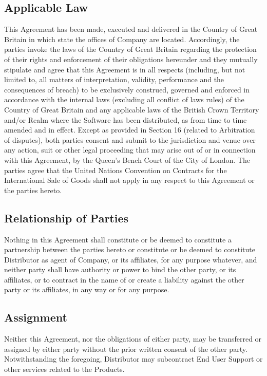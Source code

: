 \documentclass[letterpaper,10pt,english]{sphinxmanual}
\begin{document}
\subsection{Applicable Law}
\label{\detokenize{miscellaneous:applicable-law}}
This Agreement has been made, executed and delivered in the
Country of Great Britain in which state the offices of Company are located. Accordingly, the parties invoke the laws of the Country of Great Britain regarding the protection of their rights and enforcement of their obligations hereunder and they mutually stipulate and agree that this Agreement is in all respects (including, but not limited to, all matters of interpretation, validity, performance and the consequences of breach) to be exclusively construed, governed and enforced in accordance with the internal laws (excluding all conflict of laws rules) of the Country of Great Britain and any applicable laws of the British Crown Territory and/or Realm where the Software has been distributed, as from time to time amended and in effect. Except as provided in Section 16 (related to Arbitration of disputes), both parties consent and submit to the jurisdiction and venue over any action, suit or other legal proceeding that may arise out of or in connection with this Agreement, by the Queen’s Bench Court of the City of London. The parties agree that the United Nations Convention on Contracts for the International Sale of Goods shall not apply in any respect to this Agreement or the parties hereto.


\subsection{Relationship of Parties}
\label{\detokenize{miscellaneous:relationship-of-parties}}
Nothing in this Agreement shall constitute or be deemed to constitute a partnership between the parties hereto or constitute or be deemed to constitute Distributor as agent of Company, or its affiliates, for any purpose whatever, and neither party shall have  authority or power to bind the other party, or its affiliates, or to contract in the name of or create a liability against the other party or its affiliates, in any way or for any purpose.


\subsection{Assignment}
\label{\detokenize{miscellaneous:assignment}}
Neither this Agreement, nor the obligations of either party, may be transferred or assigned by either party without the prior written consent of the other party.  Notwithstanding the foregoing, Distributor may subcontract End User Support or other services related to the Products.
\end{document}

